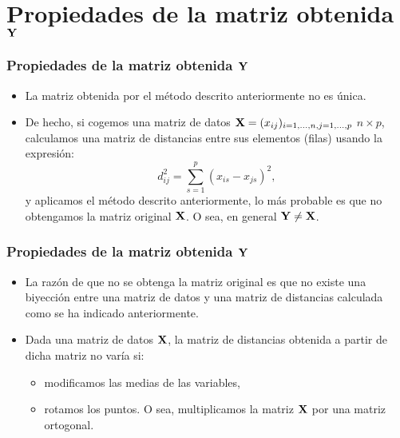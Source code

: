 \section{Propiedades de la matriz obtenida $\mathbf{Y}$}
\begin{frame}
\frametitle{Propiedades de la matriz obtenida $\mathbf{Y}$}
\begin{itemize}
\item<2->{La matriz obtenida por el método descrito anteriormente no es única.}
\item<3->{De hecho, si cogemos una matriz de datos $\mathbf{X}=(x_{ij})_{i=1,\ldots,n,j=1,\ldots,p}$ $n\times p$, calculamos una matriz de distancias entre sus elementos (filas) usando la expresión:
$$
d_{ij}^2=\sum_{s=1}^p (x_{is}-x_{js})^2,
$$
y aplicamos el método descrito anteriormente, lo más probable es que no obtengamos la matriz original $\mathbf{X}$. O sea, en general $\mathbf{Y}\not = \mathbf{X}$.}
\end{itemize}
\end{frame}
\begin{frame}
\frametitle{Propiedades de la matriz obtenida $\mathbf{Y}$}
\begin{itemize}
\item<2->{La razón de que no se obtenga la matriz original es que no existe una biyección entre una matriz de datos y una matriz de distancias calculada como se ha indicado anteriormente.}
\item<3->{Dada una matriz de datos $\mathbf{X}$, la matriz de distancias obtenida a partir de dicha matriz no varía si:
\begin{itemize}
\item<4->{modificamos las medias de las variables,}
\item<5->{rotamos los puntos. O sea, multiplicamos la matriz $\mathbf{X}$ por una matriz ortogonal.}
\end{itemize}}
\end{itemize}
\end{frame}
